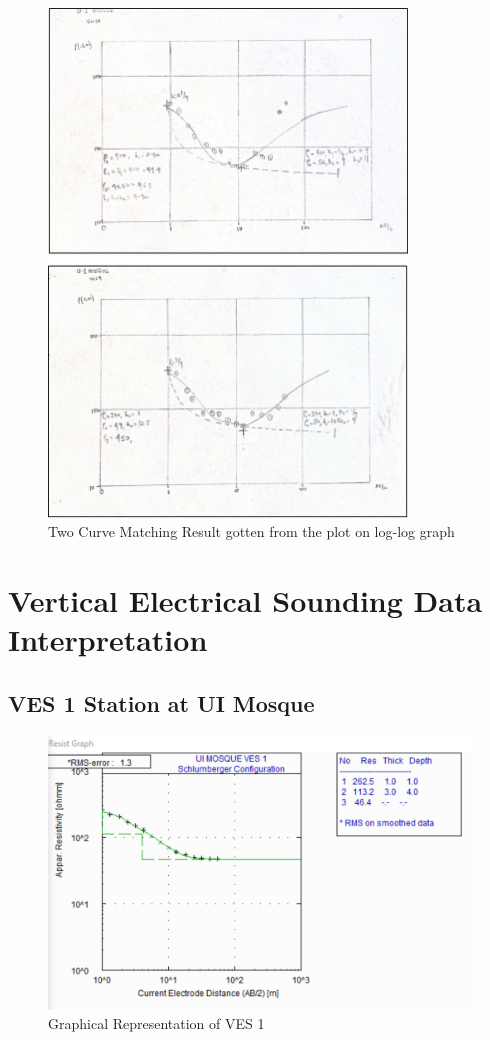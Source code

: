 \documentclass[12pt,a4paper]{report}
\begin{document}
\begin{figure}[H]
    \centering
    \includegraphics[width=0.85\textwidth]{Picture1.png}
    \caption{Two Curve Matching Result gotten from the plot on log-log graph}
    \label{fig:Curve MAtching}
\end{figure}

\section{Vertical Electrical Sounding Data Interpretation}

\subsection{VES 1 Station at UI Mosque}

\begin{figure}[H]
    \centering
    \includegraphics[width=1.0\textwidth]{ui_ves1.png}
    \caption{Graphical Representation of VES 1}
    \label{fig:VES_1_Curve}
\end{figure}
\end{document}
